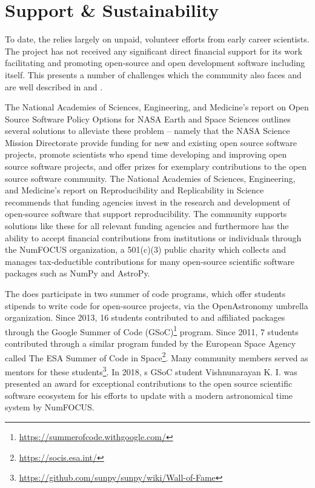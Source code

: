 \section{Support \& Sustainability}
\label{sec:intro:support}

To date, the \sunpyproj relies largely on unpaid, volunteer efforts from early career scientists.
The project has not received any significant direct financial support for its work facilitating and promoting open-source and open development software including \sunpypkg itself.
This presents a number of challenges which the \astropy community also faces and are well described in \cite{PriceWhelan:2018ji} and \cite{Muna2016}.

The National Academies of Sciences, Engineering, and Medicine's report on Open Source Software Policy Options for NASA Earth and Space Sciences \citep{NAP2018} outlines several solutions to alleviate these problem -- namely that the NASA Science Mission Directorate provide funding for new and existing open source software projects, promote scientists who spend time developing and improving open source software projects, and offer prizes for exemplary contributions to the open source software community.
The National Academies of Sciences, Engineering, and Medicine's report on Reproducibility and Replicability in Science \citep{NAP2019} recommends that funding agencies invest in the research and development of open-source software that support reproducibility.
The \sunpy community supports solutions like these for all relevant funding agencies and furthermore has the ability to accept financial contributions from institutions or individuals through the NumFOCUS organization, a 501(c)(3) public charity which collects and manages tax-deductible contributions for many open-source scientific software packages such as NumPy and AstroPy.

The \sunpyproj does participate in two summer of code programs, which offer students stipends to write code for open-source projects, via the OpenAstronomy umbrella organization.
Since 2013, 16 students contributed to \sunpypkg and affiliated packages through the Google Summer of Code (GSoC)\footnote{\url{https://summerofcode.withgoogle.com/}} program.
Since 2011, 7 students contributed through a similar program funded by the European Space Agency called The ESA Summer of Code in Space\footnote{\url{https://socis.esa.int/}}.
Many \sunpy community members served as mentors for these students\footnote{\url{https://github.com/sunpy/sunpy/wiki/Wall-of-Fame}}.
In 2018, s GSoC student Vishnunarayan K. I. was presented an award for exceptional contributions to the open source scientific software ecosystem for his efforts to update \sunpy with a modern astronomical time system by NumFOCUS.

